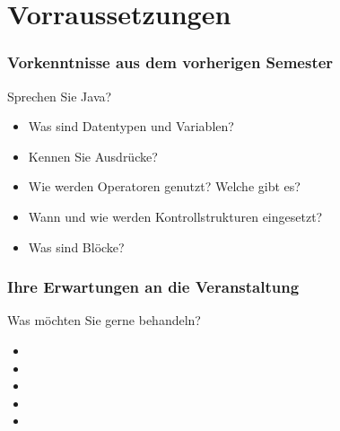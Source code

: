 
\section{Vorraussetzungen}

\begin{frame}
	\frametitle{Vorkenntnisse aus dem vorherigen Semester}
	\begin{itemize}
	  \begin{item}
	  	Sprechen Sie Java?
		  \begin{itemize}
			  \item Was sind Datentypen und Variablen?\linebreak
			  \item Kennen Sie Ausdr\"ucke?\linebreak
			  \item Wie werden Operatoren genutzt? Welche gibt es?\linebreak
			  \item Wann und wie werden Kontrollstrukturen eingesetzt?\linebreak
			  \item Was sind Bl\"ocke?\linebreak
	  	  \end{itemize} 
	  \end{item}
	\end{itemize}
\end{frame}
 
\begin{frame}
\frametitle{Ihre Erwartungen an die Veranstaltung}
	\begin{exampleblock}{Was m\"ochten Sie gerne behandeln?}
		\begin{itemize} 
			 \item{}
			 \item{}
			 \item{}
			 \item{}
			 \item{}
		\end{itemize}
	\end{exampleblock}
\end{frame}

